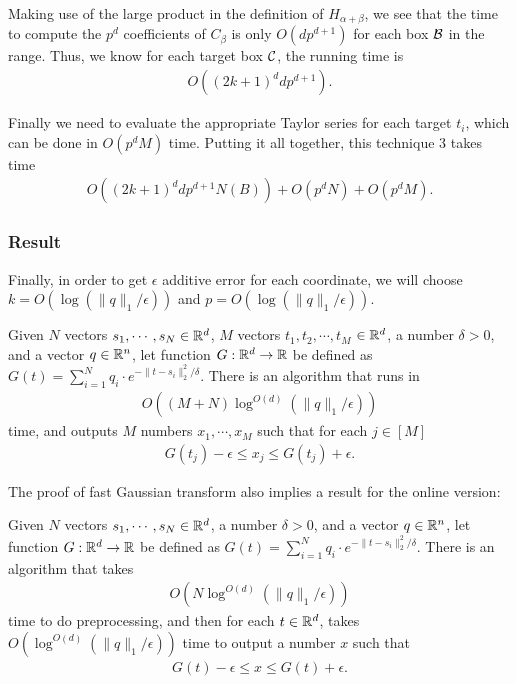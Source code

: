 Making use of the large product in the definition of $H_{\alpha+\beta}$, we see that the time to compute the $p^d$ coefficients of $C_{\beta}$ is only $O(d p^{d+1})$ for each box ${\cal B}$ in the range. Thus, we know for each target box ${\cal C}$, the running time is
\begin{align*}
O( (2k +1)^d d p^{d+1} ).
\end{align*} 

Finally we need to evaluate the appropriate Taylor series for each target $t_i$, which can be done in $O(p^d M)$ time. Putting it all together, this technique 3 takes time
\begin{align*}
O( (2k+1)^d d p^{d+1} N(B) ) + O(p^d N) + O(p^d M).
\end{align*}


\subsubsection{Result}

Finally, in order to get $\epsilon$ additive error for each coordinate, we will choose $k = O(\log (\| q \|_1 /\epsilon))$ and $p = O(\log( \| q \|_1 / \epsilon ))$.

\begin{theorem}\label{thm:fast_gaussian_transform}
Given $N$ vectors $s_1, \cdots, s_N \in {\mathbb R}^d$, $M$ vectors $t_1, t_2, \cdots, t_M$ $ \in {\mathbb R}^d$, a number $\delta > 0$, and a vector $q \in {\mathbb R}^n$, let function $G : {\mathbb R}^d \rightarrow {\mathbb R}$ be defined as $G(t) = \sum_{i=1}^N q_i \cdot e^{ -\| t - s_i \|_2^2/\delta }$. 
There is an algorithm that runs in 
\begin{align*}
O \left( (M + N) \log^{O(d)} ( \| q \|_1 / \epsilon ) \right)
\end{align*}
time, and outputs $M$ numbers $x_1, \cdots, x_M$ such that for each $j \in [M]$
\begin{align*}
 G(t_j) - \epsilon \leq x_j \leq G(t_j) +\epsilon .
\end{align*}
\end{theorem}

The proof of fast Gaussian transform also implies a result for the online version:
\begin{theorem}\label{thm:fast_gaussian_transform_online}
Given $N$ vectors $s_1, \cdots, s_N \in {\mathbb R}^d$, a number $\delta > 0$, and a vector $q \in {\mathbb R}^n$, let function $G : {\mathbb R}^d \rightarrow {\mathbb R}$ be defined as $G(t) = \sum_{i=1}^N q_i \cdot e^{ -\| t - s_i \|_2^2/\delta }$. 
There is an algorithm that takes 
\begin{align*}
O \left( N \log^{O(d)} ( \| q \|_1 / \epsilon ) \right)
\end{align*}
time to do preprocessing, and then for each $t \in {\mathbb R}^d$, takes $O(\log^{O(d)} ( \| q \|_1 / \epsilon ))$ time to output a number $x$ such that 
\begin{align*}
 G(t) - \epsilon \leq x \leq G(t) +\epsilon .
\end{align*}
\end{theorem}


